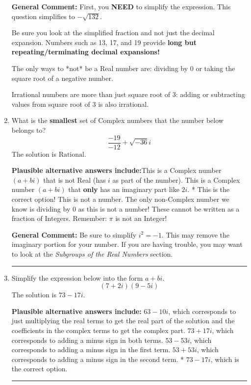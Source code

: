 \documentclass{extbook}[14pt]
\newcommand{\litem}[1]{\item #1

\rule{\textwidth}{0.4pt}}
\begin{document}
\begin{enumerate}
{\textbf{General Comment:} First, you \textbf{NEED} to simplify the expression. This question simplifies to $-\sqrt{132}$. 
 
 Be sure you look at the simplified fraction and not just the decimal expansion. Numbers such as 13, 17, and 19 provide \textbf{long but repeating/terminating decimal expansions!} 
 
 The only ways to *not* be a Real number are: dividing by 0 or taking the square root of a negative number. 
 
 Irrational numbers are more than just square root of 3: adding or subtracting values from square root of 3 is also irrational.
}
\litem{
What is the \textbf{smallest} set of Complex numbers that the number below belongs to?
\[ \frac{-19}{-12}+\sqrt{-36}i \]The solution is \( \text{Rational} \).\begin{enumerate}[label=\Alph*.]
\textbf{Plausible alternative answers include:}This is a Complex number $(a+bi)$ that is not Real (has $i$ as part of the number).
This is a Complex number $(a+bi)$ that \textbf{only} has an imaginary part like $2i$.
* This is the correct option!
This is not a number. The only non-Complex number we know is dividing by 0 as this is not a number!
These cannot be written as a fraction of Integers. Remember: $\pi$ is not an Integer!
\end{enumerate}

\textbf{General Comment:} Be sure to simplify $i^2 = -1$. This may remove the imaginary portion for your number. If you are having trouble, you may want to look at the \textit{Subgroups of the Real Numbers} section.
}
\litem{
Simplify the expression below into the form $a+bi$.
\[ (7 + 2 i)(9 - 5 i) \]The solution is \( 73 - 17 i \).\begin{enumerate}[label=\Alph*.]
\textbf{Plausible alternative answers include:} $63 - 10 i$, which corresponds to just multiplying the real terms to get the real part of the solution and the coefficients in the complex terms to get the complex part.
 $73 + 17 i$, which corresponds to adding a minus sign in both terms.
 $53 - 53 i$, which corresponds to adding a minus sign in the first term.
 $53 + 53 i$, which corresponds to adding a minus sign in the second term.
* $73 - 17 i$, which is the correct option.
\end{enumerate}

}
\end{enumerate}
\end{document}
